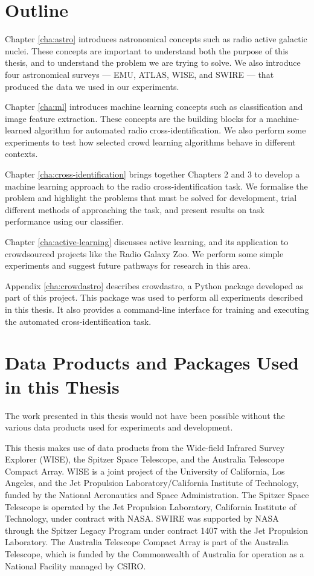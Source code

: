 \section{Outline}
\label{sec:outline}
  
  Chapter \ref{cha:astro} introduces astronomical concepts such as radio active
  galactic nuclei. These concepts are important to understand both the purpose
  of this thesis, and to understand the problem we are trying to solve. We also
  introduce four astronomical surveys --- EMU, ATLAS, WISE, and SWIRE --- that
  produced the data we used in our experiments.

  Chapter \ref{cha:ml} introduces machine learning concepts such as
  classification and image feature extraction. These concepts are the building
  blocks for a machine-learned algorithm for automated radio
  cross-identification. We also perform some experiments to test how selected
  crowd learning algorithms behave in different contexts.

  Chapter \ref{cha:cross-identification} brings together Chapters 2 and 3 to
  develop a machine learning approach to the radio cross-identification task. We
  formalise the problem and highlight the problems that must be solved for
  development, trial different methods of approaching the task, and present
  results on task performance using our classifier.

  Chapter \ref{cha:active-learning} discusses active learning, and its
  application to crowdsourced projects like the Radio Galaxy Zoo. We perform
  some simple experiments and suggest future pathways for research in this area.

  Appendix \ref{cha:crowdastro} describes crowdastro, a Python package developed
  as part of this project. This package was used to perform all experiments
  described in this thesis. It also provides a command-line interface for
  training and executing the automated cross-identification task.

\section{Data Products and Packages Used in this Thesis}
\label{sec:data-products}
  
  The work presented in this thesis would not have been possible without the
  various data products used for experiments and development.

  This thesis makes use of data products from the Wide-field Infrared Survey
  Explorer (WISE), the Spitzer Space Telescope, and the Australia Telescope
  Compact Array. WISE is a joint project of the University of California, Los
  Angeles, and the Jet Propulsion Laboratory/California Institute of Technology,
  funded by the National Aeronautics and Space Administration. The Spitzer Space
  Telescope is operated by the Jet Propulsion Laboratory, California Institute
  of Technology, under contract with NASA. SWIRE was supported by NASA through
  the Spitzer Legacy Program under contract 1407 with the Jet Propulsion
  Laboratory. The Australia Telescope Compact Array is part of the Australia
  Telescope, which is funded by the Commonwealth of Australia for operation as a
  National Facility managed by CSIRO.

